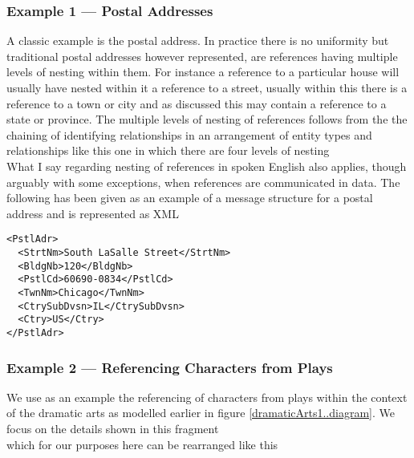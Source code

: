 \subsubsection{Example 1 --- Postal Addresses}
\mynote
A classic example is the postal address. 
In practice there is no uniformity  but traditional postal addresses however
represented, are references having multiple levels of nesting within them.
For instance a reference to a particular house will usually have nested within it a reference to a street, usually within this there is a reference to a town or city and
as discussed this may contain a reference to a state or province.  
The multiple levels of nesting of references follows from the
the chaining of identifying relationships in an arrangement
of entity types and relationships like this one in which there are four levels of nesting
\begin{equation*}

\end{equation*}
\mynote
What I say regarding nesting of references in spoken English also applies, though arguably with some exceptions, when references are communicated in data.
The following has been given as an example of a message structure for a postal address and is represented as XML
\begin{verbatim}
<PstlAdr>
  <StrtNm>South LaSalle Street</StrtNm>
  <BldgNb>120</BldgNb>
  <PstlCd>60690-0834</PstlCd>
  <TwnNm>Chicago</TwnNm>
  <CtrySubDvsn>IL</CtrySubDvsn>
  <Ctry>US</Ctry>
</PstlAdr>
\end{verbatim}

\subsubsection{Example 2 --- Referencing Characters from Plays}
\mynote
 We use as an example the referencing of characters from  plays
 within the context of  the  dramatic arts
   as modelled earlier in figure \ref{dramaticArts1..diagram}.
We focus on the details shown in this fragment 
\begin{equation*}

\end{equation*}
which for our purposes here can be rearranged like this

\begin{equation*}

\end{equation*}

